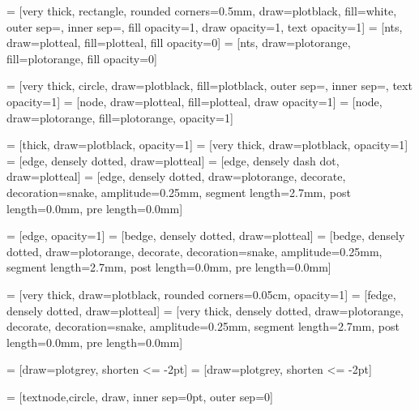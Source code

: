  = [very thick, rectangle, rounded corners=0.5mm, draw=plotblack, fill=white, outer sep=\nodespacing, inner sep=\nodesize, fill opacity=1, draw opacity=1, text opacity=1]
 = [nts, draw=plotteal, fill=plotteal, fill opacity=0]
 = [nts, draw=plotorange, fill=plotorange, fill opacity=0]

 = [very thick, circle, draw=plotblack, fill=plotblack, outer sep=\nodespacing, inner sep=\nodesize, text opacity=1]  %
 = [node, draw=plotteal, fill=plotteal, draw opacity=1]
 = [node, draw=plotorange, fill=plotorange, opacity=1]


 = [thick, draw=plotblack, opacity=1]
 = [very thick, draw=plotblack, opacity=1]
 = [edge, densely dotted, draw=plotteal]
 = [edge, densely dash dot, draw=plotteal]
 = [edge, densely dotted, draw=plotorange, decorate, decoration={snake, amplitude=0.25mm, segment length=2.7mm, post length=0.0mm, pre length=0.0mm}]

 = [edge, opacity=1]
 = [bedge, densely dotted, draw=plotteal]
 = [bedge, densely dotted, draw=plotorange, decorate, decoration={snake, amplitude=0.25mm, segment length=2.7mm, post length=0.0mm, pre length=0.0mm}]

 = [very thick, draw=plotblack, rounded corners=0.05cm, opacity=1]
 = [fedge, densely dotted, draw=plotteal]
 = [very thick, densely dotted, draw=plotorange, decorate, decoration={snake, amplitude=0.25mm, segment length=2.7mm, post length=0.0mm, pre length=0.0mm}]

 = [draw=plotgrey, shorten <= -2pt]
 = [draw=plotgrey, shorten <= -2pt]



\usetikzlibrary{pgfplots.groupplots}
\usetikzlibrary{shapes.geometric}
\usetikzlibrary{positioning,fit,shapes.geometric,backgrounds, calc}
\usetikzlibrary{arrows,decorations.markings}
\usetikzlibrary{shapes.arrows}
\usetikzlibrary{patterns}
 = [textnode,circle, draw, inner sep=0pt, outer sep=0]
                    
